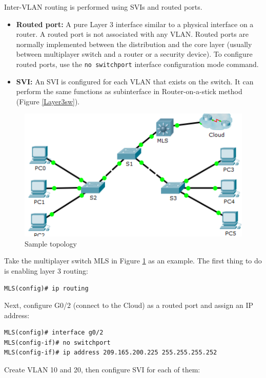 Inter-VLAN routing is performed using SVIs and routed ports.
\begin{itemize}
\item \textbf{Routed port:} A pure Layer 3 interface similar to a physical interface on a router. A routed port is not associated with any VLAN. Routed ports are normally implemented between the distribution and the core layer (usually between multiplayer switch and a router or a security device). To configure routed ports, use the \verb|no switchport| interface configuration mode command.

\item \textbf{SVI:} An SVI is configured for each VLAN that exists on the switch. It can perform the same functions as subinterface in Router-on-a-stick method (Figure \ref{Layer3sw}). 
\end{itemize}

\begin{figure}[hbtp]
\caption{Sample topology}\label{Layer3topology}
\centering
\includegraphics[scale=0.6]{pictures/Layer3topology.PNG}
\end{figure}

Take the multiplayer switch MLS in Figure \ref{Layer3topology} as an example. The first thing to do is enabling layer 3 routing:

\begin{verbatim}
MLS(config)# ip routing
\end{verbatim}

Next, configure G0/2 (connect to the Cloud) as a routed port and assign an IP address:

\begin{verbatim}
MLS(config)# interface g0/2
MLS(config-if)# no switchport
MLS(config-if)# ip address 209.165.200.225 255.255.255.252
\end{verbatim}

Create VLAN 10 and 20, then configure SVI for each of them:

